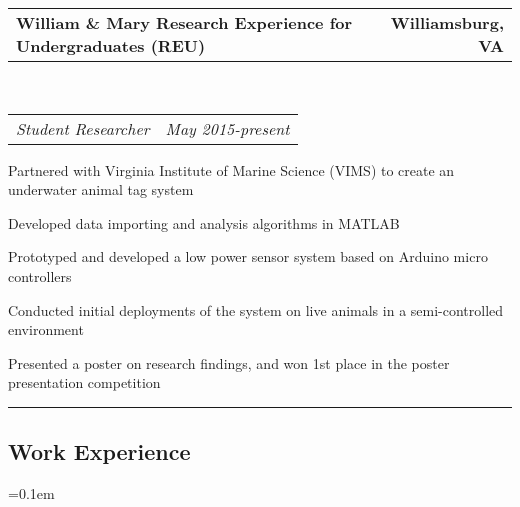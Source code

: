 \documentclass[10pt,letterpaper]{article}
\makeatletter
\newcommand{\headerrow}[2]
{\begin{tabular*}{\linewidth}{l@{\extracolsep{\fill}}r}
	#1 &
	#2 \\
\end{tabular*}}
\makeatother
\begin{document}
	\headerrow
		{\textbf{William \& Mary Research Experience for Undergraduates (REU)}}
		{\textbf{Williamsburg, VA}}
	\\
	\headerrow
		{\emph{Student Researcher}}
		{\emph{May 2015-present}}
	\begin{itemize*}
	\item Partnered with Virginia Institute of Marine Science (VIMS) to create an underwater animal tag system
	\item Developed data importing and analysis algorithms in MATLAB
	\item Prototyped and developed a low power sensor system based on Arduino micro controllers
	\item Conducted initial deployments of the system on live animals in a semi-controlled environment
	\item Presented a poster on research findings, and won 1st place in the poster presentation competition
	\end{itemize*}

\hrule
\vspace{-0.4em}
\subsection*{Work Experience}
	\parskip=0.1em
\end{document}
